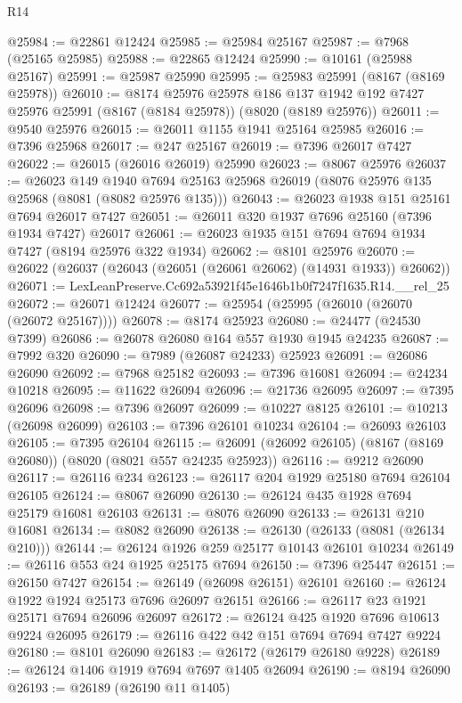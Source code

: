 \begin{lexlean}{R14}
\begin{coremodule}
@25984 := @22861 @12424
@25985 := @25984 @25167
@25987 := @7968 (@25165 @25985)
@25988 := @22865 @12424
@25990 := @10161 (@25988 @25167)
@25991 := @25987 @25990
@25995 := @25983 @25991 (@8167 (@8169 @25978))
@26010 := @8174
    @25976
    @25978
    @186
    @137
    @1942
    @192
    @7427
    @25976
    @25991
    (@8167 (@8184 @25978))
    (@8020 (@8189 @25976))
@26011 := @9540 @25976
@26015 := @26011 @1155 @1941 @25164 @25985
@26016 := @7396 @25968
@26017 := @247 @25167
@26019 := @7396 @26017 @7427
@26022 := @26015 (@26016 @26019) @25990
@26023 := @8067 @25976
@26037 := @26023
    @149
    @1940
    @7694
    @25163
    @25968
    @26019
    (@8076 @25976 @135 @25968 (@8081 (@8082 @25976 @135)))
@26043 := @26023 @1938 @151 @25161 @7694 @26017 @7427
@26051 := @26011 @320 @1937 @7696 @25160 (@7396 @1934 @7427) @26017
@26061 := @26023 @1935 @151 @7694 @7694 @1934 @7427 (@8194 @25976 @322 @1934)
@26062 := @8101 @25976
@26070 := @26022 (@26037 (@26043 (@26051 (@26061 @26062) (@14931 @1933)) @26062))
@26071 := LexLeanPreserve.Cc692a53921f45e1646b1b0f7247f1635.R14.__rel_25
@26072 := @26071 @12424
@26077 := @25954 (@25995 (@26010 (@26070 (@26072 @25167))))
@26078 := @8174 @25923
@26080 := @24477 (@24530 @7399)
@26086 := @26078 @26080 @164 @557 @1930 @1945 @24235
@26087 := @7992 @320
@26090 := @7989 (@26087 @24233) @25923
@26091 := @26086 @26090
@26092 := @7968 @25182
@26093 := @7396 @16081
@26094 := @24234 @10218
@26095 := @11622 @26094
@26096 := @21736 @26095
@26097 := @7395 @26096
@26098 := @7396 @26097
@26099 := @10227 @8125
@26101 := @10213 (@26098 @26099)
@26103 := @7396 @26101 @10234
@26104 := @26093 @26103
@26105 := @7395 @26104
@26115 := @26091 (@26092 @26105) (@8167 (@8169 @26080)) (@8020 (@8021 @557 @24235 @25923))
@26116 := @9212 @26090
@26117 := @26116 @234
@26123 := @26117 @204 @1929 @25180 @7694 @26104 @26105
@26124 := @8067 @26090
@26130 := @26124 @435 @1928 @7694 @25179 @16081 @26103
@26131 := @8076 @26090
@26133 := @26131 @210 @16081
@26134 := @8082 @26090
@26138 := @26130 (@26133 (@8081 (@26134 @210)))
@26144 := @26124 @1926 @259 @25177 @10143 @26101 @10234
@26149 := @26116 @553 @24 @1925 @25175 @7694
@26150 := @7396 @25447
@26151 := @26150 @7427
@26154 := @26149 (@26098 @26151) @26101
@26160 := @26124 @1922 @1924 @25173 @7696 @26097 @26151
@26166 := @26117 @23 @1921 @25171 @7694 @26096 @26097
@26172 := @26124 @425 @1920 @7696 @10613 @9224 @26095
@26179 := @26116 @422 @42 @151 @7694 @7694 @7427 @9224
@26180 := @8101 @26090
@26183 := @26172 (@26179 @26180 @9228)
@26189 := @26124 @1406 @1919 @7694 @7697 @1405 @26094
@26190 := @8194 @26090
@26193 := @26189 (@26190 @11 @1405)

\end{coremodule}
\end{lexlean}

